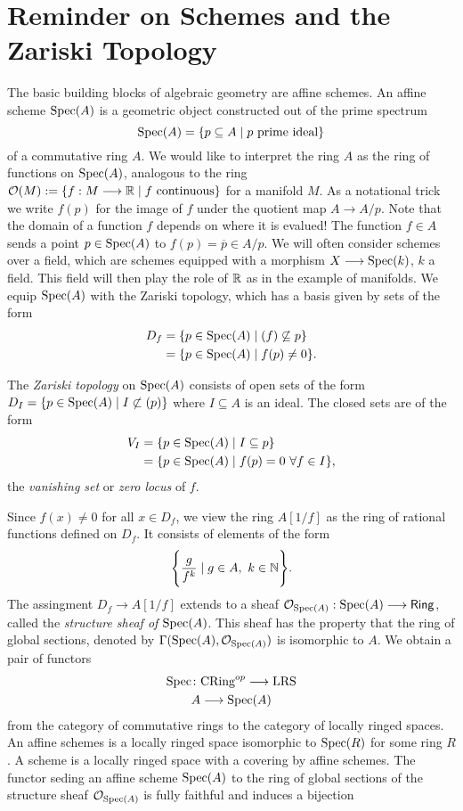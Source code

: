 \section{Reminder on Schemes and the Zariski Topology}
The basic building blocks of algebraic geometry are affine schemes. An affine scheme $\operatorname{Spec}(A)$ is a geometric object constructed out of the prime spectrum
\[
	\operatorname{Spec}(A) = \{p \subseteq A \mid p \text{ prime ideal}\}
\]
of a commutative ring $A$. We would like to interpret the ring $A$ as the ring of functions on $\operatorname{Spec}(A)$, analogous to the ring
$\mathcal{O}(M) := \{f: M \longrightarrow \mathbb{R} \mid f \text{ continuous}\}$
for a manifold $M$. As a notational trick we write $f(p)$ for the image of $f$ under the quotient map $A \to A/p$. Note that the domain of a function $f$ depends on where it is evalued! The function $f \in A$ sends a point $p \in \operatorname{Spec}(A)$ to $f(p) = \overline{p} \in A/p$.  We will often consider schemes over a field, which are schemes equipped with a morphism $X \longrightarrow \operatorname{Spec}(k)$, $k$ a field. This field will then play the role of $\mathbb{R}$ as in the example of manifolds. We equip $\operatorname{Spec}(A)$ with the Zariski topology, which has a basis given by sets of the form
\begin{align*}
	D_f & = \{ p \in \operatorname{Spec}(A) \mid (f) \not \subseteq p \} \\
	    & = \{ p \in \operatorname{Spec}(A) \mid f(p) \neq 0\}.
\end{align*}
\begin{definition}
	The \textit{Zariski topology} on $\operatorname{Spec}(A)$ consists of open sets of the form $D_I = \{ p \in \operatorname{Spec}(A) \mid I \not \subset (p)\}$ where $I \subseteq A$ is an ideal. The closed sets are of the form
	\begin{align*}
		V_I & = \{ p \in \operatorname{Spec}(A) \mid I \subseteq p \}              \\
		    & = \{ p \in \operatorname{Spec}(A) \mid f(p) = 0\ \forall f \in I \},
	\end{align*}
	the \textit{vanishing set} or \textit{zero locus} of $f$.
\end{definition}

Since $f(x) \neq 0$ for all $x \in D_f$, we view the ring $A[1/f]$ as the ring of rational functions defined on $D_f$. It consists of elements of the form
\[
	\Biggl\{ \frac{g}{f^k} \mid g \in A,\ k \in \mathbb{N} \Biggr\}.
\]
The assingment $D_f \to A[1/f]$ extends to a sheaf $\mathcal{O}_{\operatorname{Spec}(A)}: \operatorname{Spec}(A) \longrightarrow \mathsf{Ring}$, called the \textit{structure sheaf of $\operatorname{Spec}(A)$}. This sheaf has the property that the ring of global sections, denoted by $\Gamma(\operatorname{Spec}(A), \mathcal{O}_{\operatorname{Spec}(A)})$ is isomorphic to $A$. We obtain a pair of functors
\begin{gather*}
	\operatorname{Spec} \colon  \text{CRing}^{op}  \longrightarrow \text{LRS} \\
	A \longrightarrow \operatorname{Spec}(A)
\end{gather*}
from the category of commutative rings to the category of locally ringed spaces. An affine schemes is a locally ringed space isomorphic to $\operatorname{Spec}(R)$ for some ring $R$. A scheme is a locally ringed space with a covering by affine schemes. The functor seding an affine scheme $\operatorname{Spec}(A)$ to the ring of global sections of the structure sheaf $\mathcal{O}_{\operatorname{Spec}(A)}$ is fully faithful and induces a bijection

